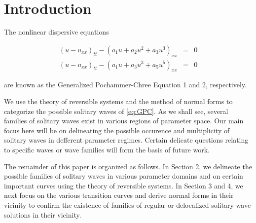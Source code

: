 \section{Introduction}

The nonlinear dispersive equations \cite{Roy1}

\begin{subequations}\label{eq:GPC}
\begin{eqnarray}
\left( u - u_{xx} \right)_{tt} - \left( a_1 u + a_2 u^2 + a_3 u^3 \right)_{xx} &=&0 \label{eq:GPC1} \\
\left( u - u_{xx} \right)_{tt} - \left( a_1 u + a_3 u^3 + a_5 u^5 \right)_{xx} &=&0 \label{eq:GPC2} 
\end{eqnarray}
\end{subequations}

are known as the Generalized Pochammer-Chree Equation 1 and 2, respectively.

We use the theory of reversible systems and the method of normal forms to categorize the possible solitary waves of \eqref{eq:GPC}.
As we shall see, several families of solitary waves exist in various regions of parameter space. Our main focus here will be on 
delineating the possible occurence and multiplicity of solitary waves in defferent parameter regimes. Certain delicate questions
relating to specific waves or wave families will form the basis of future work. 

The remainder of this paper is organized as follows. In Section 2, we delineate the possible families of solitary waves
in various parameter domains and on certain important curves using the theory of reversible systems. In Section 3 and 4, we next
focus on the various transition curves and derive normal forms in their vicinity to confirm the existence of families of 
regular or delocalized solitary-wave solutions in their vicinity.
